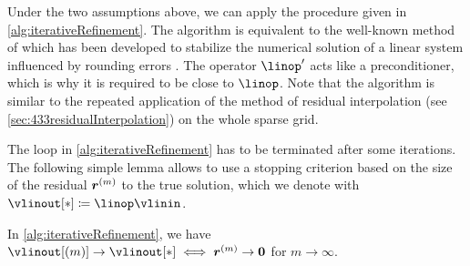 Under the two assumptions above, we can apply the procedure given in
\cref{alg:iterativeRefinement}.
The algorithm is equivalent to the well-known method of
 which has been developed to
stabilize the numerical solution of a linear system
influenced by rounding errors \cite{Higham02Accuracy}.
The operator $\linop'$ acts like a preconditioner,
which is why it is required to be close to $\linop$.
Note that the algorithm is similar to the repeated application
of the method of residual interpolation
(see \cref{sec:433residualInterpolation}) on the whole sparse grid.

\begin{algorithm}
  \begin{algorithmic}[1]
      \EndFor{}
      \vspace{-1mm}
    \EndFunction{}
  \end{algorithmic}
  \caption[%
    Iterative refinement%
  ]{%
    Application of a tensor product operator $\linop$
    on spatially adaptive sparse grids with iterative refinement,
    where $\linop'$ is an approximation of $\linop$.
    Inputs are the vector $\vlinin = (\linin{\*l,\*i})_{(\*l,\*i) \in \liset}$
    of input data (function values $\fcnval{\*l,\*i}$ at the grid points) and
    an initial solution $\vlinout[(0)]$.
    The output is the vector
    $\vlinout = (\linout{\*l,\*i})_{(\*l,\*i) \in \liset}$
    of output data (hierarchical surpluses $\surplus{\*l,\*i}$).%
  }%
  \label{alg:iterativeRefinement}%
\end{algorithm}

The loop in \cref{alg:iterativeRefinement} has to be terminated
after some iterations.
The following simple lemma allows to use a stopping criterion based on the
size of the residual ${\boldsymbol{r}}^{(m)}$ to the true solution,
which we denote with $\vlinout[\ast] \ceq \linop \vlinin$.

\begin{shortlemma}
  \label{lemma:iterativeRefinementEquivalent}
  In \cref{alg:iterativeRefinement}, we have
  $\vlinout[(m)] \to \vlinout[\ast] \iff \*r^{(m)} \to \*0$ for
  $m \to \infty$.
\end{shortlemma}

